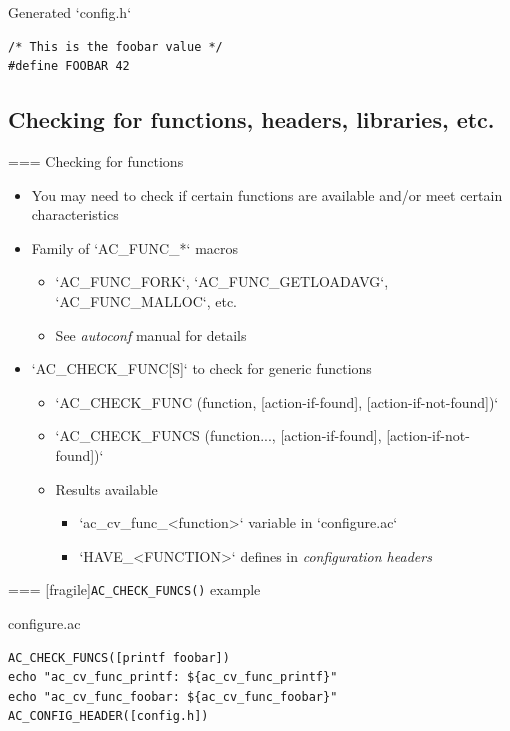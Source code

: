   \begin{block}{Generated `config.h`}
\begin{verbatim}
/* This is the foobar value */
#define FOOBAR 42
\end{verbatim}
\end{block}



\subsection{Checking for functions, headers, libraries, etc.}

=== {Checking for functions}
  \begin{itemize}
  \item You may need to check if certain functions are available
    and/or meet certain characteristics
  \item Family of `AC_FUNC_*` macros
    \begin{itemize}
    \item `AC_FUNC_FORK`, `AC_FUNC_GETLOADAVG`, `AC_FUNC_MALLOC`, etc.
    \item See {\em autoconf} manual for details
    \end{itemize}
  \item `AC_CHECK_FUNC[S]` to check for generic functions
    \begin{itemize}
    \item `AC_CHECK_FUNC (function, [action-if-found],
        [action-if-not-found])`
    \item `AC_CHECK_FUNCS (function..., [action-if-found],
        [action-if-not-found])`
    \item Results available
      \begin{itemize}
      \item `ac_cv_func_<function>` variable in
        `configure.ac`
      \item `HAVE_<FUNCTION>` defines in {\em configuration
          headers}
      \end{itemize}
    \end{itemize}
  \end{itemize}


=== [fragile]{{\tt AC\_CHECK\_FUNCS()} example}

\begin{block}{configure.ac}
\begin{verbatim}
AC_CHECK_FUNCS([printf foobar])
echo "ac_cv_func_printf: ${ac_cv_func_printf}"
echo "ac_cv_func_foobar: ${ac_cv_func_foobar}"
AC_CONFIG_HEADER([config.h])
\end{verbatim}
\end{block}

